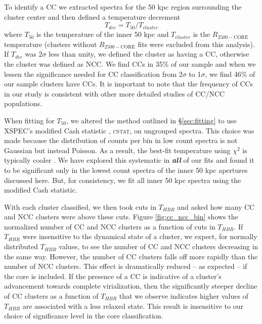 \documentclass[12pt,preprint]{aastex}
\begin{document}
To identify a CC we extracted spectra for the 50 kpc region
surrounding the cluster center and then defined a temperature
decrement 
\begin{equation}
T_{dec} = T_{50}/T_{cluster}
\label{eqn:tdec}
\end{equation}
where $T_{50}$ is the temperature of the inner 50 kpc and
$T_{cluster}$ is the $R_{2500-\mathrm{CORE}}$ temperature (clusters
without $R_{2500-\mathrm{CORE}}$ fits were excluded from this
analysis). If $T_{dec}$ was 2$\sigma$ less than unity, we defined the
cluster as having a CC, otherwise the cluster was defined as NCC. We
find CCs in 35\% of our sample and when we lessen the significance
needed for CC classification from 2$\sigma$ to 1$\sigma$, we find 46\%
of our sample clusters have CCs. It is important to note that the
frequency of CCs in our study is consistent with other more detailed
studies of CC/NCC populations.

When fitting for $T_{50}$, we altered the method outlined
in \S\ref{sec:fitting} to use {\textsc{XSPEC}}'s modified Cash statistic
\citep{1979ApJ...228..939C}, {\textsc{cstat}}, on ungrouped
spectra. This choice was made because the distribution of counts per
bin in low count spectra is not Gaussian but instead
Poisson. As a result, the best-fit temperature using $\chi^2$ is
typically cooler \citep{1989ApJ...342.1207N, 2007A&A...462..429B}. We
have explored this systematic in {\bfseries\em{all}} of our fits and
found it to be significant only in the lowest count spectra of the
inner 50 kpc apertures discussed here. But, for consistency, we fit all
inner 50 kpc spectra using the modified Cash statistic.

With each cluster classified, we then took cuts in $T_{HBR}$ 
and asked how many CC and NCC clusters were above these cuts. 
Figure \ref{fig:cc_ncc_bin} shows the normalized number of CC and NCC
clusters as a function of cuts in $T_{HBR}$. If $T_{HBR}$ were insensitive to
the dynamical state of a cluster, we expect, for normally
distributed $T_{HBR}$ values, to see the number of CC and NCC clusters
decreasing in the same way. However, the number of CC clusters falls off
more rapidly than the number of NCC clusters. This effect
is dramatically reduced -- as expected -- if the core is included.
If the presence of a CC is indicative of a cluster's advancement
towards complete virialization, then the significantly steeper
decline of CC clusters as a function of $T_{HBR}$ that we observe indicates
higher values of $T_{HBR}$ are associated with a less relaxed state. This
result is insensitive to our choice of significance level in the core
classification.
\end{document}
